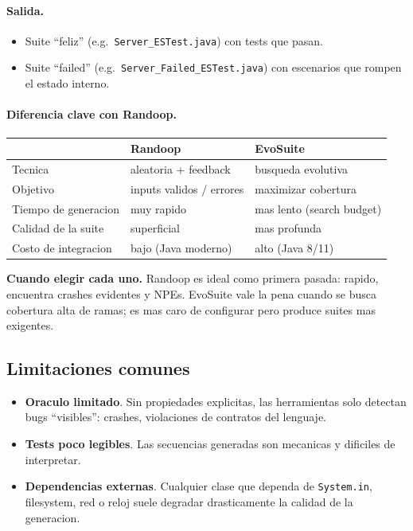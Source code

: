 \documentclass[12pt,a4paper]{article}
\begin{document}
\paragraph{Salida.}
\begin{itemize}
  \item Suite ``feliz'' (e.g.\ \texttt{Server\_ESTest.java}) con tests que pasan.
  \item Suite ``failed'' (e.g.\ \texttt{Server\_Failed\_ESTest.java}) con escenarios que
  rompen el estado interno.
\end{itemize}

\paragraph{Diferencia clave con Randoop.}

\begin{center}
\begin{tabular}{lll}
\toprule
& Randoop & EvoSuite \\
\midrule
Tecnica & aleatoria + feedback & busqueda evolutiva \\
Objetivo & inputs validos / errores & maximizar cobertura \\
Tiempo de generacion & muy rapido & mas lento (search budget) \\
Calidad de la suite & superficial & mas profunda \\
Costo de integracion & bajo (Java moderno) & alto (Java 8/11) \\
\bottomrule
\end{tabular}
\end{center}

\begin{ideabox}
\textbf{Cuando elegir cada uno.} Randoop es ideal como primera pasada: rapido, encuentra
crashes evidentes y NPEs. EvoSuite vale la pena cuando se busca cobertura alta de ramas; es
mas caro de configurar pero produce suites mas exigentes.
\end{ideabox}

\subsection{Limitaciones comunes}

\begin{itemize}
  \item \textbf{Oraculo limitado}. Sin propiedades explicitas, las herramientas solo detectan
  bugs ``visibles'': crashes, violaciones de contratos del lenguaje.
  \item \textbf{Tests poco legibles}. Las secuencias generadas son mecanicas y dificiles de
  interpretar.
  \item \textbf{Dependencias externas}. Cualquier clase que dependa de \texttt{System.in},
  filesystem, red o reloj suele degradar drasticamente la calidad de la generacion.
\end{itemize}
\end{document}
